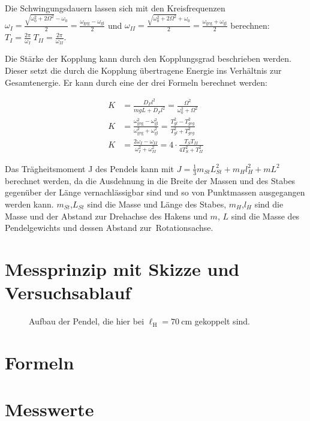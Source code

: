 \documentclass[
12pt,
a4paper,
bibliography=totocnumbered, %
twoside, %
BCOR=1cm, %
]{scrartcl}
\newcommand{\lh}{\ell_{\mathrm{H}}}
\begin{document}
Die Schwingungsdauern lassen sich mit den Kreisfrequenzen $ \omega_I=\frac{\sqrt{\omega_0^2+2\Omega^2}-\omega_0}{2}=\frac{\omega_{\text{geg}}-\omega_{\text{gl}}}{2}$ und $\omega_{II}=\frac{\sqrt{\omega_0^2+2\Omega^2}+\omega_0}{2}=\frac{\omega_{\text{geg}}+\omega_{\text{gl}}}{2}$ berechnen: $T_I=\frac{2\pi}{\omega_I} \  T_{II}=\frac{2\pi}{\omega_{II}}$.

Die Stärke der Kopplung kann durch den Kopplungsgrad beschrieben werden. Dieser setzt die durch die Kopplung übertragene Energie ins Verhältnis zur Gesamtenergie. Er kann durch eine der drei Formeln berechnet werden:

\begin{align}
	K&=\frac{D_Fl^2}{mgL+D_Fl^2}=\frac{\Omega^2}{\omega_0^2+\Omega^2}\\
	K&=\frac{\omega_{\text{geg}}^2-\omega_{\text{gl}}^2}{\omega_{\text{geg}}^2+\omega_{\text{gl}}^2}=\frac{T_{gl}^2-T_{geg}^2}{T_{gl}^2+T_{geg}^2}\\
	K&=\frac{2\omega_I-\omega_{II}}{\omega_I^2+\omega_{II}^2}=4\cdot\frac{T_ST_{II}}{4T_S^2+T_{II}^2}
\end{align}

Das Trägheitsmoment J des Pendels kann mit $J=\frac{1}{3}m_{St}L_{St}^2+m_Hl_H^2+mL^2$ berechnet werden, da die Ausdehnung in die Breite der Massen und des Stabes gegenüber der Länge vernachlässigbar sind und so von Punktmassen ausgegangen werden kann. $m_{St}$,$L_{St}$ sind die Masse und Länge des Stabes, $m_H$,$l_H$ sind die Masse und der Abstand zur Drehachse des Hakens und $m$, $L$ sind die Masse des Pendelgewichts und dessen Abstand zur Rotationsachse.

\section[Messprinzip]{Messprinzip mit Skizze und Versuchsablauf}

\begin{figure}[H]
	\caption{Aufbau der Pendel, die hier bei \(\lh = \qty{70}{\centi\meter}\) gekoppelt sind.}
	\label{fig:aufbau}
\end{figure}



\section[Formeln]{Formeln}

\section{Messwerte}
\end{document}
